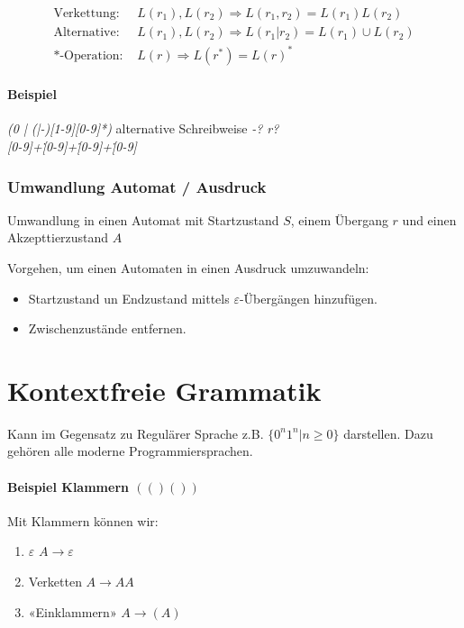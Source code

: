 \begin{align*}
\text{Verkettung: } & L(r_1), L(r_2) \Rightarrow L(r_1,r_2) = L(r_1)L(r_2) \\
\text{Alternative: }& L(r_1),L(r_2) \Rightarrow L(r_1|r_2) = L(r_1) \cup L(r_2) \\
\text{*-Operation: }& L(r) \Rightarrow L(r^\ast) = L(r)^\ast
\end{align*}

\paragraph{Beispiel}

	\emph{(0 | (|-)[1-9][0-9]*)}  alternative Schreibweise \emph{-? r?} \\
	\emph{[0-9]+\.[0-9]+\.[0-9]+\.[0-9]}


\subsubsection{Umwandlung Automat / Ausdruck}
Umwandlung in einen Automat mit Startzustand $S$, einem Übergang $r$ und einen Akzepttierzustand $A$

Vorgehen, um einen Automaten in einen Ausdruck umzuwandeln:

\begin{itemize}
	\item Startzustand un Endzustand mittels $\varepsilon$-Übergängen hinzufügen.
	\item Zwischenzustände entfernen.
\end{itemize}

\section{Kontextfreie Grammatik}


Kann im Gegensatz zu Regulärer Sprache z.B. $\{0^n1^n | n \geq 0 \}$ darstellen. Dazu gehören alle moderne Programmiersprachen.

\paragraph{Beispiel Klammern $(()())$}

Mit Klammern können wir:

\begin{enumerate}
	\item $\varepsilon$ \hfill $A \to \varepsilon$
	\item Verketten \hfill $A \to AA$
	\item «Einklammern» \hfill $A \to (A)$
\end{enumerate}

